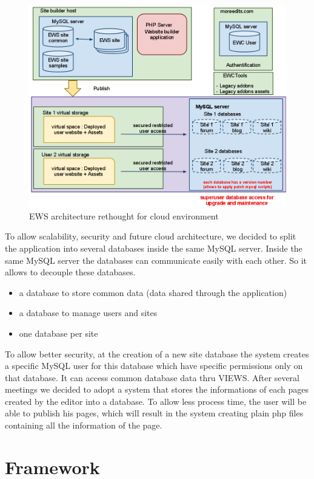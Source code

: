 \begin{figure}[!ht]
\centering
\includegraphics[width=.55\textwidth]{img/ews_archi_after.png}
\caption{EWS architecture rethought for cloud environment}
\label{figure:ews_archi_after}
\end{figure}

To allow scalability, security and future cloud architecture, we decided to split the application into several databases inside the same MySQL server. Inside the same MySQL server the databases can communicate easily with each other. So it allows to decouple these databases.
\begin{itemize}
\item a database to store common data (data shared through the application)
\item a database to manage users and sites
\item one database per site 
\end{itemize}
To allow better security, at the creation of a new site database the system creates a specific MySQL user for this database which have specific permissions only on that database. It can access common database data thru VIEWS.
After several meetings we decided to adopt a system that stores the informations of each pages created by the editor into a database. To allow less process time, the user will be able to publish his pages, which will result in the system creating plain php files containing all the information of the page.

\section{Framework}

